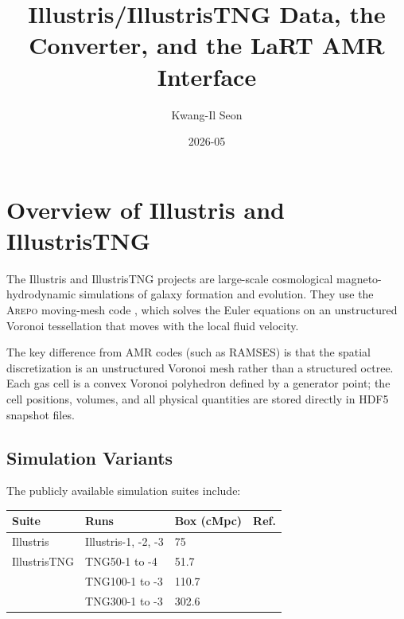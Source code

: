 \documentclass[english,a4paper]{my_memo}
\begin{document}
\title{Illustris/IllustrisTNG Data, the Converter, and the LaRT AMR Interface}
\author{Kwang-Il Seon}
\date{2026-05}
\maketitle

\tableofcontents
\bigskip

\section{Overview of Illustris and IllustrisTNG}
\label{sec:overview}

The Illustris \cite{vogelsberger2014,nelson2015} and IllustrisTNG
\cite{nelson2019,pillepich2018} projects are large-scale cosmological
magneto-hydrodynamic simulations of galaxy formation and evolution.
They use the \textsc{Arepo} moving-mesh code \cite{springel2010}, which
solves the Euler equations on an unstructured Voronoi tessellation that
moves with the local fluid velocity.

The key difference from AMR codes (such as RAMSES) is that the spatial
discretization is an unstructured Voronoi mesh rather than a structured
octree.  Each gas cell is a convex Voronoi polyhedron defined by a
generator point; the cell positions, volumes, and all physical
quantities are stored directly in HDF5 snapshot files.

\subsection{Simulation Variants}

The publicly available simulation suites include:

\begin{center}
\begin{tabular}{llll}
\toprule
\textbf{Suite} & \textbf{Runs} & \textbf{Box (cMpc)} & \textbf{Ref.} \\
\midrule
Illustris    & Illustris-1, -2, -3        & 75         & \cite{vogelsberger2014} \\
IllustrisTNG & TNG50-1 to -4              & 51.7       & \cite{nelson2019} \\
             & TNG100-1 to -3             & 110.7      &  \\
             & TNG300-1 to -3             & 302.6      &  \\
\bottomrule
\end{tabular}
\end{center}
\end{document}
